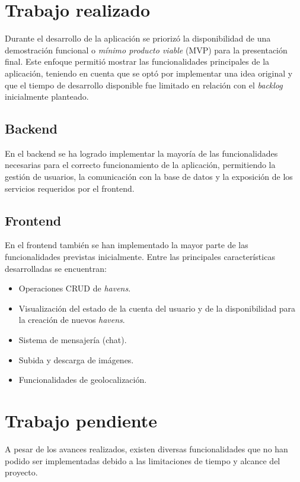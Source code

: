 \section{Trabajo realizado}

Durante el desarrollo de la aplicación se priorizó la disponibilidad de una demostración funcional o \textit{mínimo producto viable} (MVP) para la presentación final.  
Este enfoque permitió mostrar las funcionalidades principales de la aplicación, teniendo en cuenta que se optó por implementar una idea original y que el tiempo de desarrollo disponible fue limitado en relación con el \textit{backlog} inicialmente planteado.

\subsection{Backend}

En el backend se ha logrado implementar la mayoría de las funcionalidades necesarias para el correcto funcionamiento de la aplicación, permitiendo la gestión de usuarios, la comunicación con la base de datos y la exposición de los servicios requeridos por el frontend.

\subsection{Frontend}

En el frontend también se han implementado la mayor parte de las funcionalidades previstas inicialmente. Entre las principales características desarrolladas se encuentran:

\begin{itemize}
    \item Operaciones CRUD de \textit{havens}.
    \item Visualización del estado de la cuenta del usuario y de la disponibilidad para la creación de nuevos \textit{havens}.
    \item Sistema de mensajería (chat).
    \item Subida y descarga de imágenes.
    \item Funcionalidades de geolocalización.
\end{itemize}

\section{Trabajo pendiente}

A pesar de los avances realizados, existen diversas funcionalidades que no han podido ser implementadas debido a las limitaciones de tiempo y alcance del proyecto.

